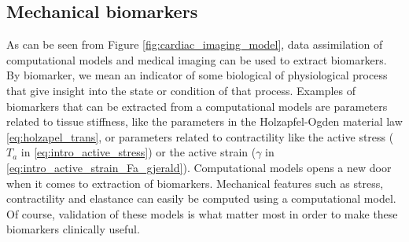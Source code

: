\subsection{Mechanical biomarkers}
As can be seen from Figure \ref{fig:cardiac_imaging_model}, data
assimilation of computational models and medical imaging can be used to
extract biomarkers. By biomarker, we mean an indicator of some
biological of physiological process that give insight into the state
or condition of that process. Examples of biomarkers that can be
extracted from a computational models are parameters related to tissue
stiffness, like the parameters in the Holzapfel-Ogden material law
\eqref{eq:holzapel_trans}, or parameters related to contractility like
the active stress ($T_a$ in \eqref{eq:intro_active_stress}) or the
active strain ($\gamma$ in \eqref{eq:intro_active_strain_Fa_gjerald}).
Computational models opens a new door when it comes to extraction of
biomarkers. Mechanical features such as stress, contractility and
elastance can easily be computed using a computational model. Of
course, validation of these models is what matter most in order to
make these biomarkers clinically useful. 









